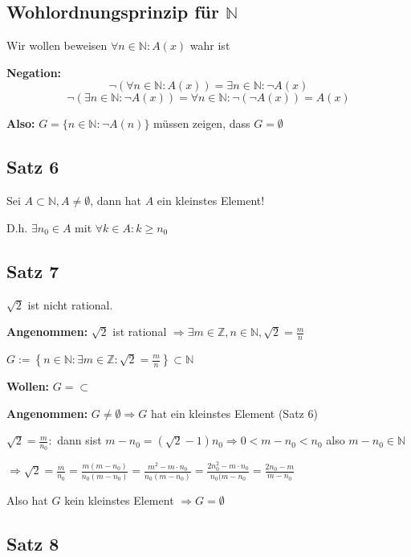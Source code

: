 \documentclass[fleqn]{scrbook}
\begin{document}
\subsection{Wohlordnungsprinzip für \texorpdfstring{$\mathbb{N}$}{N}}

Wir wollen beweisen $\forall n \in \mathbb{N}: A(x)$ wahr ist

\textbf{Negation:}
\[\lnot(\forall n \in \mathbb{N}: A(x))=\exists n \in \mathbb{N}: \lnot A(x)\]
\[\lnot(\exists n \in \mathbb{N}: \lnot A(x))=\forall n \in \mathbb{N}: \lnot(\lnot A(x)) = A(x)\]

\textbf{Also:} $G=\{n\in \mathbb{N}: \lnot A(n)\}$ müssen zeigen, dass $G=\emptyset$

\subsection{Satz 6}

Sei $A \subset \mathbb{N}, A \neq \emptyset$, dann hat $A$ ein kleinstes Element!

D.h. $\exists n_0 \in A$ mit $\forall k \in A: k \geq n_0$

\subsection{Satz 7}

$\sqrt{2}$ ist nicht rational.

\textbf{Angenommen:} $\sqrt{2}$ ist rational $\Longrightarrow \exists m \in \mathbb{Z}, n \in \mathbb{N}, \sqrt{2}=\frac{m}{n}$

$G:=\left\{ n \in \mathbb{N}: \exists m \in \mathbb{Z}: \sqrt{2} = \frac{m}{n} \right\} \subset \mathbb{N}$

\textbf{Wollen:} $G=\subset$

\textbf{Angenommen:} $G \neq \emptyset \Longrightarrow G$ hat ein kleinstes Element (Satz 6)

$\sqrt{2}=\frac{m}{n_0}:$ dann sist $m-n_0 = (\sqrt{2}-1)n_0 \Longrightarrow 0<m-n_0<n_0$ also $m-n_0 \in \mathbb{N}$

$\Longrightarrow \sqrt{2} = \frac{m}{n_0} = \frac{m(m-n_0)}{n_0(m-n_0)} = \frac{m^2-m \cdot n_0}{n_0(m-n_0)} = \frac{2n_0^2-m \cdot n_0}{n_0(m-n_0} = \frac{2n_0-m}{m-n_0}$

Also hat $G$ kein kleinstes Element $\Longrightarrow G = \emptyset$ 

\subsection{Satz 8}
\end{document}
